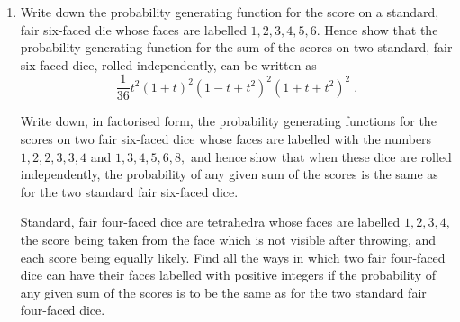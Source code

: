 \documentclass[a4, 11pt]{report}
\newlength{\qspace}
\newcounter{qnumber}
\newenvironment{question}%
 {\vspace{\qspace}
  \begin{enumerate}[\bfseries 1\quad][10]%
    \setcounter{enumi}{\value{qnumber}}%
    \item%
 }
{
  \end{enumerate}
  \filbreak
  \stepcounter{qnumber}
 }
\def\l{\left(}
\def\r{\right)}
\begin{document}
\begin{question}
Write down the probability generating function for 
the score on a standard, fair six-faced die whose faces are labelled 
$1, 2, 3, 4, 5, 6$. Hence show that the probability 
generating function for the sum of the scores on two standard, 
fair six-faced dice, rolled independently, can be written as
\[
\frac1{36} t^2 \l 1 + t \r^2 \l 1 - t + t^2 \r^2 \l 1 + t + t^2 \r^2 \;.
\]

Write down, in factorised form, the probability generating functions for 
the scores on two fair six-faced dice whose faces are labelled with the 
numbers $1, 2, 2, 3, 3, 4$ and $1, 3, 4, 5, 6, 8,$ 
and hence show that when these dice are rolled independently, 
the probability of any given sum of the scores is the same as for the two standard 
fair six-faced dice.

Standard, fair four-faced dice are tetrahedra whose faces are labelled $1, 2, 3, 4,$ 
the score being taken from the face which is not 
visible after throwing, and each score being equally likely. 
Find all the ways in which two fair four-faced dice can have 
their faces labelled with positive integers if the probability 
of any given sum of the scores is to be the same as for the two standard 
fair four-faced dice.
\end{question}
	
\end{document}
